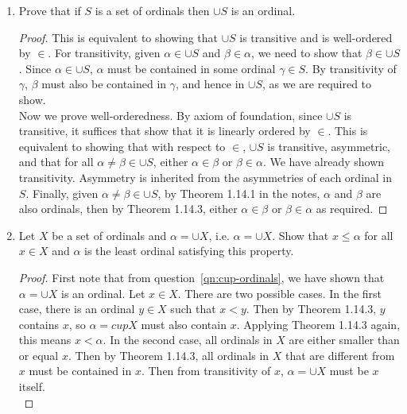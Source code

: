 \documentclass{article}
\begin{document}
\begin{enumerate}
    \begin{proof}
      No, the composition is not an order relation because it is symmetric.
      Consider the counter example $B_1=\{(x,y)\}$ and $B_2=\{(y,x)\}$.
      Then $B_1\circ B_2=\{(x,x)\}$, which is not an asymmetric relation.
    \end{proof}

  \item Prove that if $S$ is a set of ordinals then $\cup S$ is an ordinal.
    \label{qn:cup-ordinals}
    \begin{proof}
      This is equivalent to showing that $\cup S$ is transitive and is
      well-ordered by $\in$. For transitivity, given $\alpha\in\cup S$ and
      $\beta\in\alpha$, we need to show that $\beta\in\cup S$. Since
      $\alpha\in\cup S$, $\alpha$ must be contained in some ordinal
      $\gamma\in S$. By transitivity of $\gamma$, $\beta$ must also be
      contained in $\gamma$, and hence in $\cup S$, as we are required to
      show. \\

      Now we prove well-orderedness. By axiom of foundation, since $\cup S$
      is transitive, it suffices that show that it is linearly ordered by
      $\in$. This is equivalent to showing that with respect to $\in$,
      $\cup S$ is transitive, asymmetric, and that for all
      $\alpha\neq\beta\in\cup S$, either $\alpha\in\beta$ or
      $\beta\in\alpha$. We have already shown transitivity. Asymmetry is
      inherited from the asymmetries of each ordinal in $S$. Finally, given
      $\alpha\neq\beta\in\cup S$, by Theorem 1.14.1 in the notes, $\alpha$
      and $\beta$ are also ordinals, then by Theorem 1.14.3, either
      $\alpha\in\beta$ or $\beta\in\alpha$ as required.
    \end{proof}

  \item Let $X$ be a set of ordinals and $\alpha=\cup X$, i.e. $\alpha=\cup
    X$. Show that $x\leq\alpha$ for all $x\in X$ and $\alpha$ is the least
    ordinal satisfying this property.

    \begin{proof}
      First note that from question~\ref{qn:cup-ordinals}, we have shown
      that $\alpha=\cup X$ is an ordinal. Let $x\in X$. There are two
      possible cases. In the first case, there is an ordinal $y\in X$ such
      that $x<y$. Then by Theorem 1.14.3, $y$ contains $x$, so $\alpha=cup
      X$ must also contain $x$. Applying Theorem 1.14.3 again, this means
      $x<\alpha$. In the second case, all ordinals in $X$ are either
      smaller than or equal $x$. Then by Theorem 1.14.3, all ordinals in
      $X$ that are different from $x$ must be contained in $x$. Then from
      transitivity of $x$, $\alpha=\cup X$ must be $x$ itself. \\


\end{proof}
\end{enumerate}
\end{document}
